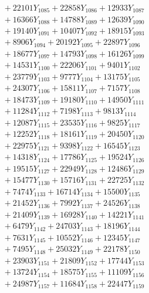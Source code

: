 \documentclass[a4paper,10pt]{article}
\begin{document}
{\begin{align}
&\;  + 22101 Y_{1085} + 22858 Y_{1086} + 12933 Y_{1087} \\[0.3ex]
&\;  + 16366 Y_{1088} + 14788 Y_{1089} + 12639 Y_{1090} \\[0.3ex]
&\;  + 19140 Y_{1091} + 10407 Y_{1092} + 18915 Y_{1093} \\[0.3ex]
&\;  + 8906 Y_{1094} + 20192 Y_{1095} + 22897 Y_{1096} \\[0.3ex]
&\;  + 18677 Y_{1097} + 14793 Y_{1098} + 16126 Y_{1099} \\[0.3ex]
&\;  + 14531 Y_{1100} + 22206 Y_{1101} + 9401 Y_{1102} \\[0.3ex]
&\;  + 23779 Y_{1103} + 9777 Y_{1104} + 13175 Y_{1105} \\[0.3ex]
&\;  + 24307 Y_{1106} + 15811 Y_{1107} + 7157 Y_{1108} \\[0.5ex]\allowbreak
&\;  + 18473 Y_{1109} + 19180 Y_{1110} + 14950 Y_{1111} \\[0.3ex]
&\;  + 11284 Y_{1112} + 7198 Y_{1113} + 9813 Y_{1114} \\[0.3ex]
&\;  + 12087 Y_{1115} + 23535 Y_{1116} + 9825 Y_{1117} \\[0.3ex]
&\;  + 12252 Y_{1118} + 18161 Y_{1119} + 20450 Y_{1120} \\[0.3ex]
&\;  + 22975 Y_{1121} + 9398 Y_{1122} + 16545 Y_{1123} \\[0.3ex]
&\;  + 14318 Y_{1124} + 17786 Y_{1125} + 19524 Y_{1126} \\[0.3ex]
&\;  + 19515 Y_{1127} + 22949 Y_{1128} + 12486 Y_{1129} \\[0.3ex]
&\;  + 15477 Y_{1130} + 15716 Y_{1131} + 22725 Y_{1132} \\[0.3ex]
&\;  + 7474 Y_{1133} + 16714 Y_{1134} + 15500 Y_{1135} \\[0.3ex]
&\;  + 21452 Y_{1136} + 7992 Y_{1137} + 24526 Y_{1138} \\[0.5ex]\allowbreak
&\;  + 21409 Y_{1139} + 16928 Y_{1140} + 14221 Y_{1141} \\[0.3ex]
&\;  + 6479 Y_{1142} + 24703 Y_{1143} + 18196 Y_{1144} \\[0.3ex]
&\;  + 7631 Y_{1145} + 10552 Y_{1146} + 12345 Y_{1147} \\[0.3ex]
&\;  + 7495 Y_{1148} + 25032 Y_{1149} + 22178 Y_{1150} \\[0.3ex]
&\;  + 23903 Y_{1151} + 21809 Y_{1152} + 17744 Y_{1153} \\[0.3ex]
&\;  + 13724 Y_{1154} + 18575 Y_{1155} + 11109 Y_{1156} \\[0.3ex]
&\;  + 24987 Y_{1157} + 11684 Y_{1158} + 22447 Y_{1159} \\[0.3ex]

\end{align}}
\end{document}
